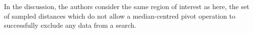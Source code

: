In the discussion, the authors consider the same region of interest as here, the set of sampled distances which do not allow a median-centred pivot operation to successfully exclude any data from a search. 


